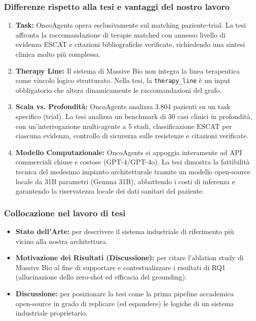 \documentclass[11pt,a4paper]{article}
\newcommand{\code}[1]{\texttt{\small #1}}
\begin{document}
\subsubsection*{Differenze rispetto alla tesi e vantaggi del nostro lavoro}
\begin{enumerate}
  \item \textbf{Task:} OncoAgents opera esclusivamente sul matching paziente-trial. La tesi affronta la raccomandazione di terapie matched con annesso livello di evidenza ESCAT e citazioni bibliografiche verificate, richiedendo una sintesi clinica molto più complessa.
  \item \textbf{Therapy Line:} Il sistema di Massive Bio non integra la linea terapeutica come vincolo logico strutturato. Nella tesi, la \code{therapy\_line} è un input obbligatorio che altera dinamicamente le raccomandazioni del grafo.
  \item \textbf{Scala vs. Profondità:} OncoAgents analizza 3.804 pazienti su un task specifico (trial). La tesi analizza un benchmark di 30 casi clinici in profondità, con un'interrogazione multi-agente a 5 stadi, classificazione ESCAT per ciascuna evidenza, controllo di sicurezza sulle resistenze e citazioni verificate.
  \item \textbf{Modello Computazionale:} OncoAgents si appoggia interamente ad API commerciali chiuse e costose (GPT-4/GPT-4o). La tesi dimostra la fattibilità tecnica del medesimo impianto architetturale tramite un modello open-source locale da 31B parametri (Gemma 31B), abbattendo i costi di inferenza e garantendo la riservatezza locale dei dati sanitari del paziente.
\end{enumerate}

\subsubsection*{Collocazione nel lavoro di tesi}
\begin{itemize}
  \item \textbf{Stato dell'Arte:} per descrivere il sistema industriale di riferimento più vicino alla nostra architettura.
  \item \textbf{Motivazione dei Risultati (Discussione):} per citare l'ablation study di Massive Bio al fine di supportare e contestualizzare i risultati di RQ1 (allucinazione dello zero-shot ed efficacia del grounding).
  \item \textbf{Discussione:} per posizionare la tesi come la prima pipeline accademica open-source in grado di replicare (ed espandere) le logiche di un sistema industriale proprietario.
\end{itemize}
\end{document}
